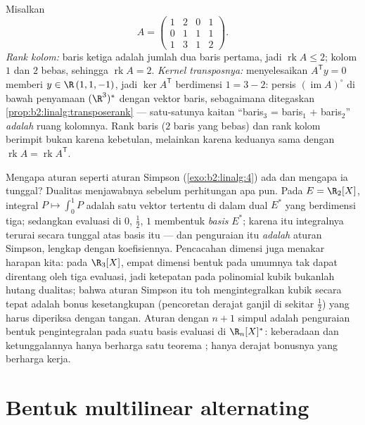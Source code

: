 \begin{example}\label{ex:b2:linalg:rankbothsides}
Misalkan
\[
A = \begin{pmatrix}
1 & 2 & 0 & 1\\
0 & 1 & 1 & 1\\
1 & 3 & 1 & 2
\end{pmatrix} .
\]
\emph{Rank kolom:} baris ketiga adalah jumlah dua baris pertama, jadi
$\operatorname{rk} A \leq 2$; kolom $1$ dan $2$ bebas, sehingga
$\operatorname{rk} A = 2$. \emph{Kernel transposnya:} menyelesaikan
$A^{\mathsf T}y = 0$ memberi $y \in \R\,(1, 1, -1)$, jadi $\ker
A^{\mathsf T}$ berdimensi $1 = 3 - 2$: persis
$(\operatorname{im} A)^\circ$ di bawah penyamaan
$(\R^3)^*$ dengan vektor baris, sebagaimana ditegaskan
\cref{prop:b2:linalg:transposerank} --- satu-satunya
kaitan ``baris$_3$ = baris$_1$ + baris$_2$'' \emph{adalah}
 ruang kolomnya. Rank baris ($2$ baris yang bebas) dan
rank kolom berimpit bukan karena kebetulan, melainkan karena keduanya
sama dengan $\operatorname{rk} A = \operatorname{rk} A^{\mathsf T}$.
\end{example}

\begin{example}\label{ex:b2:linalg:quadratureread}
Mengapa aturan seperti aturan Simpson (\cref{exo:b2:linalg:4}) ada
dan mengapa ia tunggal? Dualitas menjawabnya sebelum perhitungan apa pun.
Pada $E = \R_2[X]$, integral $P \mapsto \int_0^1 P$ adalah satu
vektor tertentu di dalam dual $E^*$ yang berdimensi tiga; sedangkan
evaluasi di $0$, $\frac12$, $1$ membentuk \emph{basis}
$E^*$; karena itu integralnya terurai secara tunggal atas basis itu ---
dan penguraian itu \emph{adalah} aturan Simpson, lengkap dengan
koefisiennya. Pencacahan dimensi juga menakar harapan kita: pada $\R_3[X]$,
empat dimensi bentuk pada umumnya tak dapat direntang oleh tiga
evaluasi, jadi ketepatan pada polinomial kubik bukanlah hutang
dualitas; bahwa aturan Simpson itu toh mengintegralkan kubik secara tepat
adalah bonus kesetangkupan (pencoretan derajat ganjil di sekitar
$\frac12$) yang harus diperiksa dengan tangan. Aturan dengan $n + 1$
simpul adalah penguraian bentuk pengintegralan pada suatu basis
evaluasi di $\R_n[X]^*$: keberadaan dan ketunggalannya hanya berharga
satu teorema ; hanya derajat bonusnya yang berharga kerja.
\end{example}

\section{Bentuk multilinear alternating}

